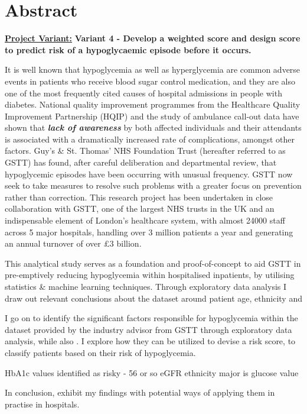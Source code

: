 
\section*{Abstract}


    \textbf{\underline{Project Variant:}} \textbf{ Variant 4 - Develop a weighted score and design score to predict risk of a hypoglycaemic episode before it occurs.} 

    \vspace{10pt}
    \par{ \noindent It is well known that hypoglycemia as well as hyperglycemia are common adverse events in patients who receive blood sugar control medication, and they are also one of the most frequently cited causes of hospital admissions in people with diabetes. National quality improvement programmes from the Healthcare Quality Improvement Partnership (HQIP) and the study of ambulance call-out data have shown that \textbf{\textit{lack of awareness}} by both affected individuals and their attendants is associated with a dramatically increased rate of complications, amongst other factors. Guy's \& St. Thomas' NHS Foundation Trust (hereafter referred to as GSTT) has found, after careful deliberation and departmental review, that hypoglycemic episodes have been occurring with unusual frequency. GSTT now seek to take measures to resolve such problems with a greater focus on prevention rather than correction. This research project has been undertaken in close collaboration with GSTT, one of the largest NHS trusts in the UK and an indispensable element of London's healthcare system, with almost 24000 staff across 5 major hospitals, handling over 3 million patients a year and generating an annual turnover of over \pounds3 billion.}

    \vspace{10pt}
    \par{ \noindent This analytical study serves as a foundation and proof-of-concept to aid GSTT in pre-emptively reducing hypoglycemia within hospitalised inpatients, by utilising statistics \& machine learning techniques. Through exploratory data analysis I draw out relevant conclusions about the dataset around patient age, ethnicity and 
    
    I go on to identify the significant factors responsible for hypoglycemia within the dataset provided by the industry advisor from GSTT through exploratory data analysis, while also . I explore how they can be utilized to devise a risk score, to classify patients based on their risk of hypoglycemia. 
    
    HbA1c values identified as risky - 56 or so 
    eGFR 
    ethnicity
    major is glucose value 
    
 In conclusion, exhibit my findings with potential ways of applying them in practise in hospitals.}

